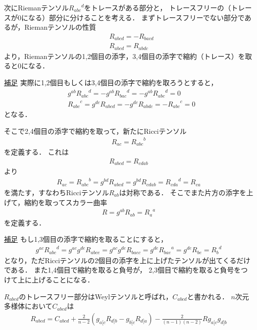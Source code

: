 \documentclass[a4paper]{jsarticle}
\begin{document}
次にRiemanテンソル${R_{abc}}^d$をトレースがある部分と，
トレースフリーの（トレースが0になる）部分に分けることを考える．
まずトレースフリーでない部分であるが，Riemanテンソルの性質
\begin{align}
	&R_{abcd} = -R_{bacd} \\
	&R_{abcd} = R_{abdc}
\end{align}
より，Riemanテンソルの1,2個目の添字，3,4個目の添字で縮約（トレース）を取ると0になる．
\begin{itembox}[l]{\underline{補足}}
	実際に1,2個目もしくは3,4個目の添字で縮約を取ろうとすると，
	\begin{align}
		&g^{ab} {R_{abc}}^d = -g^{ab} {R_{bac}}^d = -g^{ab} {R_{abc}}^d = 0 \\
		&{R_{abc}}^c = g^{dc} R_{abcd} = -g^{dc} R_{abdc}
		= -{R_{abc}}^c = 0
	\end{align}
	となる．
\end{itembox}
そこで2,4個目の添字で縮約を取って，新たにRicciテンソル
\begin{align}
	R_{ac} = {R_{abc}}^b
\end{align}
を定義する．
これは
\begin{align}
	R_{abcd} = R_{cdab}
\end{align}
より
\begin{align}
	R_{ac} = {R_{abc}}^b = g^{bd} R_{abcd} = g^{bd} R_{cdab} = {R_{cda}}^d
	= R_{ca}
\end{align}
を満たす，すなわちRicciテンソル$R_{ab}$は対称である．
そこでまた片方の添字を上げて，縮約を取ってスカラー曲率
\begin{align}
	R = g^{ab} R_{ab} = {R_a}^a
\end{align}
を定義する．
\begin{itembox}[l]{\underline{補足}}
	もし1,3個目の添字で縮約を取ることにすると，
	\begin{align}
		g^{ac} {R_{abc}}^d = g^{ac} g^{de} R_{abce} = g^{ac} g^{de} R_{baec}
		= g^{de} {R_{bae}}^a = g^{de} R_{be} = {R_b}^d
	\end{align}
	となり，ただRicciテンソルの2個目の添字を上に上げたテンソルが出てくるだけである．
	また1,4個目で縮約を取ると負号が，
	2,3個目で縮約を取ると負号をつけて上に上げることになる．
\end{itembox}
$R_{abcd}$のトレースフリー部分はWeylテンソルと呼ばれ，$C_{abcd}$と書かれる．
$n$次元多様体において$C_{abcd}$は
\begin{align}
	R_{abcd} = C_{abcd} + \frac{2}{n-2} \left(
		g_{a[c} R_{d]b} - g_{b[c} R_{d]a}
	\right) - \frac{2}{(n-1)(n-2)} R g_{a[c} g_{d]b}
\end{align}
\end{document}
